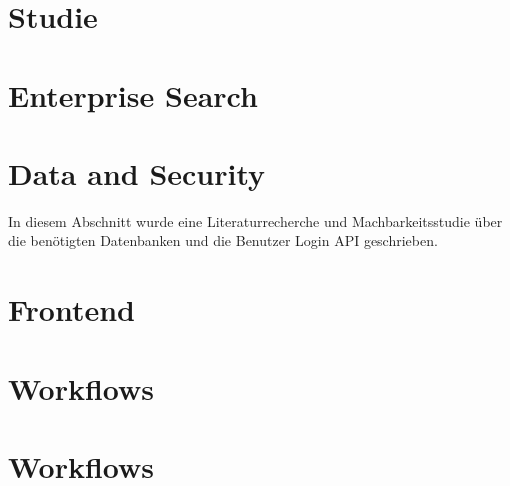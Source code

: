 \chapter{Studie}
\chapter{Enterprise Search}


\newpage

\chapter{Data and Security}\label{data&securityAlex}
In diesem Abschnitt wurde eine Literaturrecherche und Machbarkeitsstudie über die benötigten Datenbanken und die Benutzer Login API geschrieben. 

\newpage

\chapter{Frontend}


\newpage

\chapter{Workflows}


\newpage

\chapter{Workflows}


\newpage